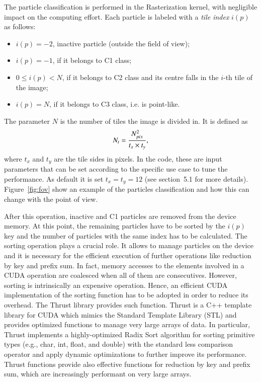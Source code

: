 \documentclass[1p]{elsarticle}
\begin{document}
The particle classification is performed in the Rasterization kernel, with negligible impact
on the computing effort. Each particle is labeled
with a {\it tile index} $i(p)$ as follows:
\begin{itemize}
\item 
$i(p) = -2$, inactive particle (outside the field of view);
\item
$i(p) = -1$, if it belongs to C1 class; 
\item
$0 \le i(p) < N$, if it belongs to C2 class and its centre falls in the $i$-th tile of the image;  
\item
$i(p) = N$, if it belongs to C3 class, i.e. is point-like.
\end{itemize}
The parameter $N$ is the number of tiles the image is divided in. It is defined as
\begin{equation}
N_t = {N_{pix}^2\over t_x \times t_y},   
\end{equation}
where $t_x$ and $t_y$ are the tile sides in pixels. In the code, these are input parameters 
that can be set according to the specific use case to tune the performance. As default it is set $t_x=t_y=12$ (see section~5.1 for more details). 
Figure~\ref{fig:fov} show an example of the particles classification and
how this can change with the point of view. 

After this operation, inactive and C1 particles are removed from the device memory. At this point, the remaining particles 
have to be sorted by the $i(p)$ key and the number of particles with the same index has to
be calculated. 
The sorting operation plays a crucial role. It allows to manage particles on the 
device and it is necessary for the efficient execution of further operations like 
reduction by key and prefix sum. In fact, memory accesses to the elements involved 
in a CUDA operation are coalesced when all of them are consecutives. However, sorting 
is intrinsically an expensive operation. Hence, an efficient CUDA implementation of
the sorting function has to be adopted in order to reduce its overhead. 
The Thrust library \cite{thrusturl} provides such function. Thrust is a C++ template library 
for CUDA which mimics the Standard Template Library (STL) and provides 
optimized functions to manage very large arrays of data. In particular, Thrust 
implements a highly-optimized Radix Sort algorithm for sorting primitive types
(e.g., char, int, float, and double) with the standard less comparison operator and 
apply dynamic optimizations to further improve its performance.
Thrust functions provide also effective functions for reduction by key and prefix sum, which are 
increasingly performant on very large arrays.
\end{document}
